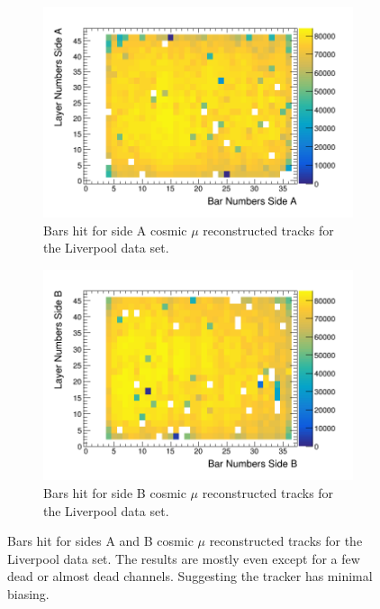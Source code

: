 \begin{figure}[htbp]
\centering
\begin{subfigure}{.5\textwidth}
  \centering
  \includegraphics[width=\linewidth]{Chapter5/Figs/wylfaRasterNew/liverpoolSideAHits.png}
  \captionsetup{width=.9\linewidth}
  \caption{Bars hit for side A cosmic $\mu$ reconstructed tracks for the Liverpool data set.}
  \label{subFig:liverpoolSideAHits}
\end{subfigure}%
\begin{subfigure}{.5\textwidth}
  \centering
\includegraphics[width=\linewidth]{Chapter5/Figs/wylfaRasterNew/liverpoolSideBHits.png}
  \captionsetup{width=.9\linewidth}
  \caption{Bars hit for side B cosmic $\mu$ reconstructed tracks for the Liverpool data set.}
  \label{subFig:liverpoolSideBHits}
\end{subfigure}
\caption{Bars hit for sides A and B cosmic $\mu$ reconstructed tracks for the Liverpool data set. The results are mostly even except for a few dead or almost dead channels. Suggesting the tracker has minimal biasing.}
\label{fig:liverpoolSideABHits}
\end{figure}

